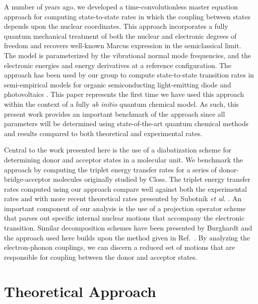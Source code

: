 A number of years ago,  we developed a time-convolutionless  master equation approach for computing
state-to-state rates in which the coupling between  states depends upon the
nuclear coordinates\cite{pereverzev2006time}. This approach incorporates a fully quantum
mechanical treatment of both the nuclear and electronic degrees of freedom and recovers
well-known Marcus expression in the semiclassical limit.  The model is parameterized by the
vibrational normal mode frequencies, and the electronic energies and energy derivatives
at a reference configuration.  The approach has been used by our group to compute state-to-state
transition rates in semi-empirical models for organic semiconducting light-emitting diode and photovoltaics
\cite{tamura2008phonon,tamura2007exciton,bittner2014noise,singh2009fluorescence}.
This paper represents the first time we have used this approach within the context of a fully {\em ab initio} quantum
chemical model.   As such, this present work provides an important benchmark of the approach since all parameters will be determined
using state-of-the-art quantum chemical methods
and results compared to both theoretical and experimental
rates.

Central to the work presented here is the use of a diabatization scheme for determining
donor and acceptor states in a molecular unit.  We benchmark the approach
by computing the  triplet energy transfer rates for a series of donor-bridge-acceptor molecules
originally studied by Closs\cite{miller1984intramolecular}.  The triplet energy transfer rates computed using our approach
compare well against both the experimental rates and with
more recent theoretical rates presented by Subotnik {\em et al.}
\cite{subotnik2008constructing,subotnik2009initial,subotnik2010predicting}.
An important component of our analysis is the use of a projection operator scheme
that parses out specific internal nuclear motions that accompany
the electronic transition.
Similar decomposition schemes have been presented by Burghardt
 \cite{cederbaum2005short,gindensperger2006shortI,gindensperger2006shortII,cederbaum2005short}
 and the approach used here builds upon the method given in Ref.~\cite{pereverzev2009energy}.
 By analyzing the electron-phonon couplings, we can
discern a reduced set of motions that are responsible for coupling between the donor and
acceptor states.



\section{Theoretical Approach}

